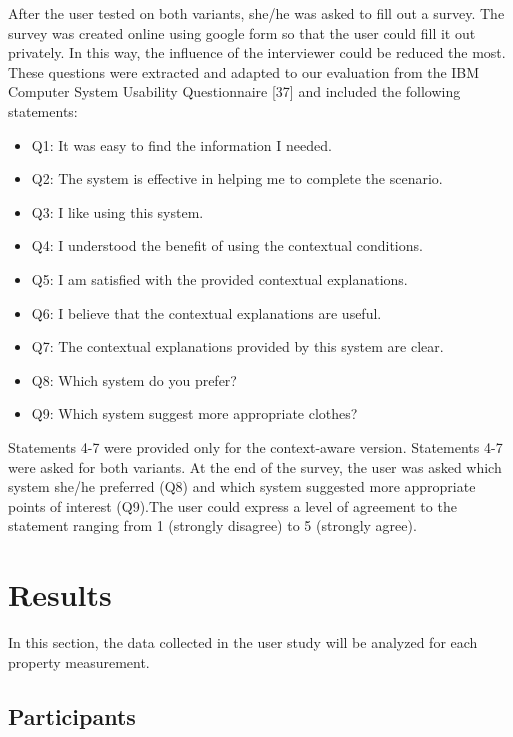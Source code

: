 \begin{enumerate}
After the user tested on both variants, she/he was asked to fill out a survey. The survey was created online using google form so that the user could fill it out privately. In this way, the influence of the interviewer could be reduced the most. These questions were extracted and adapted to our evaluation from the IBM Computer System Usability Questionnaire [37] and included the following statements:

\begin{itemize}
\item{Q1: It was easy to find the information I needed. }
\item{Q2: The system is effective in helping me to complete the scenario. }
\item{Q3: I like using this system.}
\item{Q4: I understood the benefit of using the contextual conditions. }
\item{Q5: I am satisfied with the provided contextual explanations. }
\item{Q6: I believe that the contextual explanations are useful.}
\item{Q7: The contextual explanations provided by this system are clear. }
\item{Q8: Which system do you prefer?}
\item{Q9: Which system suggest more appropriate clothes?}
\end{itemize}

Statements 4-7 were provided only for the context-aware version. Statements 4-7 were asked for both variants. At the end of the survey, the user was asked which system she/he preferred (Q8) and which system suggested more appropriate points of interest (Q9).The user could express a level of agreement to the statement ranging from 1 (strongly disagree) to 5 (strongly agree). 

\end{enumerate}

\section{Results} \label{sec:results}

In this section, the data collected in the user study will be analyzed for each property measurement.

\subsection{Participants} \label{sec:results_p}

